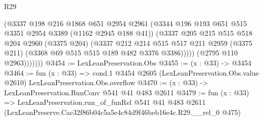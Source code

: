 \begin{lexlean}{R29}
\begin{coremodule}
                  (@3337
                    @198
                    @216
                    @1868
                    @651
                    @2954
                    @2961
                    (@3344 @196 @193 @651 @515 @3351 @2954 @3389 (@1162 @2945 @188 @41))
                    (@3337
                      @205
                      @215
                      @515
                      @518
                      @204
                      @2960
                      (@3375 @204)
                      (@3337
                        @212
                        @214
                        @515
                        @517
                        @211
                        @2959
                        (@3375 @211)
                        (@3368 @69 @515 @515 @189 @482 @3376 @3386)))))
                (@2795 @110 @2963)))))))
@3454 := LexLeanPreservation.Obs
@3455 := (x : @33) -> @3454
@3464 := fun (x : @33) =>
  cond.{1} @3454 @2605 (LexLeanPreservation.Obs.value @2610) LexLeanPreservation.Obs.overflow
@3470 := (x : @33) -> LexLeanPreservation.RunConv @541 @41 @483 @2611
@3479 := fun (x : @33) =>
  LexLeanPreservation.run_of_funRel
    @541
    @41
    @483
    @2611
    (LexLeanPreserve.Cac32f86b04c5a5e4c84d9f46beb16e4c.R29.__rel_0 @475)
\end{coremodule}
\end{lexlean}
